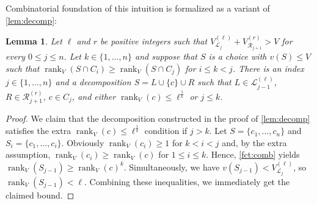\documentclass{article}
\theoremstyle{plain}
\newtheorem{lemma}[theorem]{Lemma}
\theoremstyle{definition}
\renewcommand{\L}{\mathcal{L}}
\newcommand{\R}{\mathcal{R}}
\DeclareMathOperator*{\rank}{rank}
\begin{document}
    Combinatorial foundation of this intuition is formalized as a variant of \cref{lem:decomp}:
     
  \begin{lemma}\label{lem:decomp2}
  Let $\ell$ and $r$ be positive integers such that $V^{(\ell)}_{\L_j}+V^{(r)}_{\R_{j+1}}> V$  for every $0\le j \le n$.
  Let $k \in \{1,\ldots,n\}$ and suppose that $S$ is a choice with $v(S)\le V$ such that $\rank_V(S\cap C_i)\ge \rank_V(S\cap C_j)$ for $i \le k < j$.
    There is an index $j\in\{1,\ldots,n\}$ and a decomposition $S=L\cup\{c\}\cup R$
  such that $L\in \L_{j-1}^{(\ell)}$, $R\in \R_{j+1}^{(r)}$, $c\in C_j$, and either $\rank_V(c)\le \ell^{\frac{1}{k}}$ or $j \le k$.
  \end{lemma}
  \begin{proof}
  We claim that the decomposition constructed in the proof of \cref{lem:decomp} satisfies the extra $\rank_V(c)\le \ell^{\frac{1}{k}}$
  condition if $j > k$. Let $S = \{c_1,\ldots,c_n\}$ and $S_i = \{c_1,\ldots,c_i\}$.
  Obviously $\rank_V(c_i)\ge 1$ for $k < i < j$ and, by the extra assumption, $\rank_V(c_i)\ge \rank_V(c)$ for $1\le i \le k$. Hence, \cref{fct:comb} yields $\rank_V(S_{j-1})\ge \rank_V(c)^k$. Simultaneously, we have $v(S_{j-1})<V^{(\ell)}_{\L_j}$,
  so $\rank_V(S_{j-1})<\ell$. Combining these inequalities, we immediately get the claimed bound.
  \end{proof}
    
\end{document}
